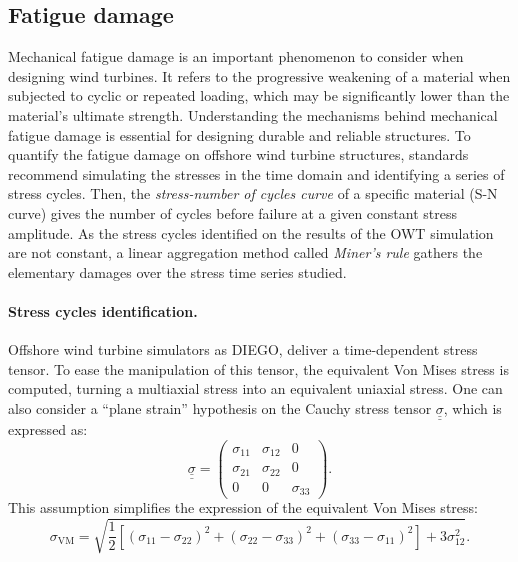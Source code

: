 \subsection{Fatigue damage}\label{sec:235}

Mechanical fatigue damage is an important phenomenon to consider when designing wind turbines. 
It refers to the progressive weakening of a material when subjected to cyclic or repeated loading, which may be significantly lower than the material's ultimate strength. 
Understanding the mechanisms behind mechanical fatigue damage is essential for designing durable and reliable structures. 
To quantify the fatigue damage on offshore wind turbine structures, standards \citep{dnv_fatigue_2016} recommend simulating the stresses in the time domain and identifying a series of stress cycles. 
Then, the \textit{stress-number of cycles curve} of a specific material (S-N curve) gives the number of cycles before failure at a given constant stress amplitude. 
As the stress cycles identified on the results of the OWT simulation are not constant, a linear aggregation method called \textit{Miner's rule} gathers the elementary damages over the stress time series studied. 


\paragraph{Stress cycles identification.}
Offshore wind turbine simulators as DIEGO, deliver a time-dependent stress tensor. 
To ease the manipulation of this tensor, the equivalent Von Mises stress is computed, turning a multiaxial stress into an equivalent uniaxial stress. 
One can also consider a ``plane strain'' hypothesis on the Cauchy stress tensor $\underline{\underline{\sigma}}$, which is expressed as:
\begin{equation}
    \underline{\underline{\sigma}} = \begin{pmatrix}
                            \sigma_{11} & \sigma_{12} & 0\\
                            \sigma_{21} & \sigma_{22} & 0\\
                            0 & 0 & \sigma_{33}
                            \end{pmatrix}.
\end{equation}
This assumption simplifies the expression of the equivalent Von Mises stress: 
\begin{equation}
    \sigma _{\mathrm{VM}}=\sqrt{{\frac {1}{2}}\left[(\sigma _{11}-\sigma _{22})^{2}+(\sigma _{22}-\sigma _{33})^{2}+(\sigma _{33}-\sigma _{11})^{2}\right] + 3 \sigma _{12}^{2}}.
\end{equation}


